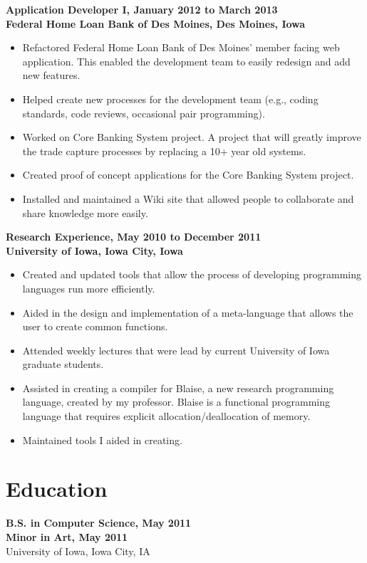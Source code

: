 \documentclass[margin]{res}
\begin{document}
\begin{resume}
 {\bf  Application Developer I, January 2012 to March 2013\\
   Federal Home Loan Bank of Des Moines, Des Moines, Iowa}
 \begin{itemize} \itemsep -2pt
 \item Refactored Federal Home Loan Bank of Des Moines' member facing web application. This enabled the development team to easily redesign and add new features.
 \item Helped create new processes for the development team (e.g., coding standards, code reviews, occasional pair programming). 
 \item Worked on Core Banking System project. A project that will greatly improve the trade capture processes by replacing a 10+ year old systems.
 \item Created proof of concept applications for the Core Banking System project.
 \item Installed and maintained a Wiki site that allowed people to collaborate and share knowledge more easily.
 \end{itemize}

 {\bf  Research Experience, May 2010 to December 2011\\
 University of Iowa, Iowa City, Iowa}
 \begin{itemize} \itemsep -2pt 
 \item Created and updated tools that allow the process of developing programming languages run more efficiently.
 \item Aided in the design and implementation of a meta-language that allows the user to create common functions. 
 \item Attended weekly lectures that were lead by current University of Iowa graduate students.
 \item Assisted in creating a compiler for Blaise, a new research programming language, created by my professor. Blaise is a functional programming language that requires explicit allocation/deallocation of memory.
 \item Maintained tools I aided in creating.
 \end{itemize}
  

 \section{Education} 
{\bf B.S. in Computer Science, May 2011\\
Minor in Art, May 2011}\\
University of Iowa, Iowa City, IA


\end{resume}
\end{document}
